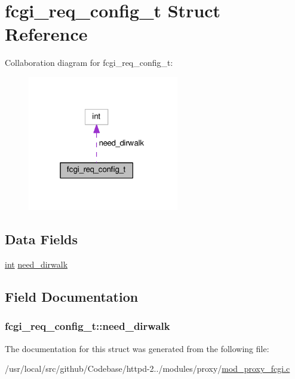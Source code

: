\hypertarget{structfcgi__req__config__t}{}\section{fcgi\+\_\+req\+\_\+config\+\_\+t Struct Reference}
\label{structfcgi__req__config__t}


Collaboration diagram for fcgi\+\_\+req\+\_\+config\+\_\+t\+:
\nopagebreak
\begin{figure}[H]
\begin{center}
\leavevmode
\includegraphics[width=187pt]{structfcgi__req__config__t__coll__graph}
\end{center}
\end{figure}
\subsection*{Data Fields}
\begin{DoxyCompactItemize}
\item 
\hyperlink{pcre_8txt_a42dfa4ff673c82d8efe7144098fbc198}{int} \hyperlink{structfcgi__req__config__t_afda66e30cf6b58a18e81c86e85031a75}{need\+\_\+dirwalk}
\end{DoxyCompactItemize}


\subsection{Field Documentation}
\subsubsection[{\texorpdfstring{need\+\_\+dirwalk}{need_dirwalk}}]{ fcgi\+\_\+req\+\_\+config\+\_\+t\+::need\+\_\+dirwalk}\hypertarget{structfcgi__req__config__t_afda66e30cf6b58a18e81c86e85031a75}{}\label{structfcgi__req__config__t_afda66e30cf6b58a18e81c86e85031a75}


The documentation for this struct was generated from the following file\+:\begin{DoxyCompactItemize}
\item 
/usr/local/src/github/\+Codebase/httpd-\/2../modules/proxy/\hyperlink{mod__proxy__fcgi_8c}{mod\+\_\+proxy\+\_\+fcgi.\+c}\end{DoxyCompactItemize}
